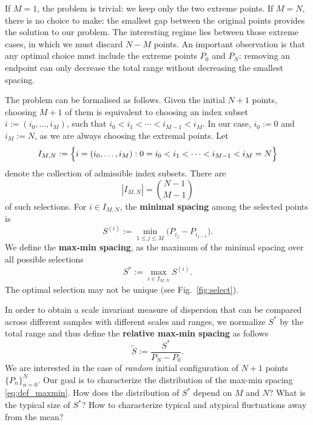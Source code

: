 \documentclass[a4paper,reqno,11pt]{amsart}
\numberwithin{equation}{section}
\numberwithin{thm}{section}
\theoremstyle{plain}
\theoremstyle{definition}
\begin{document}
    If $M=1$, the problem is trivial: we keep only the two extreme points.
    If $M=N$, there is no choice to make: the smallest gap between the original points provides the solution to our problem. 
    The interesting regime lies between those extreme cases, in which we must discard $N-M$ points.
{An important observation is that }any optimal choice must include the extreme points $P_0$ and $P_N$: removing an endpoint can only decrease the total range without decreasing the smallest spacing. 


The problem can be formalised as follows. %
Given the initial $N+1$ points, choosing $M+1$ of them is equivalent to choosing an index subset $i:=(i_0,\dots,i_M)$, such that $i_0<i_1<\cdots<i_{M-1}<i_M$. In our case, $i_0:=0$ and $i_M:=N$, as we are always choosing the extremal points. Let 
\begin{equation}\label{I_MN}
   I_{M,N}:=\Bigl\{ i=(i_0,\dots,i_M): 
0=i_0<i_1<\cdots<i_{M-1}<i_M=N \Bigr\} 
\end{equation}
denote the collection of admissible index subsets. There are 
\begin{equation}
    |I_{M,N}|=\binom{N-1}{M-1}
\end{equation}
of such selections.
For $i\in I_{M,N}$, the \textbf{minimal spacing} among the selected points is
\begin{equation}
\label{eq:min_spacing}
    S^{(i)} :=\min_{1\le j\le M}\bigl(P_{i_j}-P_{i_{j-1}}\bigr).
\end{equation}
We define the \textbf{max-min spacing}, as the maximum of the minimal spacing over all possible selections
\begin{equation}
\label{eq:def_maxmin}
S^*:=\max_{i\in I_{M,N}} S^{(i)}.
\end{equation}
The optimal selection may not be unique (see Fig.~\ref{fig:select}).

In order to obtain a {scale invariant measure of dispersion  that can be compared across different samples with different scales and ranges,} we normalize $S^*$ by the total range and thus define the \textbf{relative max-min spacing} as follows
\begin{equation}
\label{eq:def_relmaxmin}
\widetilde S:=\frac{S^*}{P_N-P_0}.
\end{equation}
We are interested in the case of \emph{random} initial configuration of $N+1$ points $\{P_{{n}}\}_{{{n}}=0}^N$. Our goal is to characterize the distribution of the max-min spacing \eqref{eq:def_maxmin}. How does the distribution of $S^*$ depend on $M$ and $N$? What is the typical size of $S^*$? How to characterize typical and atypical fluctuations away from the mean?
\end{document}
